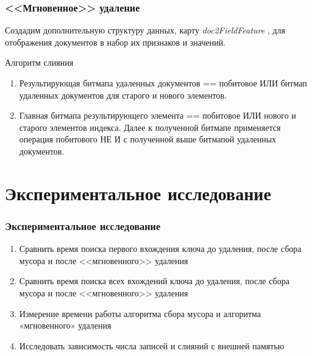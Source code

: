 \documentclass[aspectratio=169, pdf, 8pt, unicode]{beamer}
\begin{document}
\begin{frame}[fragile]
\frametitle{<<Мгновенное>> удаление}

Создадим дополнительную структуру данных, карту \textit{doc2FieldFeature} , для отображения документов в набор их признаков и значений.

\begin{block}{Алгоритм слияния}
    \begin{enumerate}
        \item Результирующая битмапа удаленных документов == побитовое ИЛИ битмап удаленных документов для старого и нового элементов.
        \item Главная битмапа результирующего элемента == побитовое ИЛИ нового и старого элементов индекса. Далее к полученной битмапе
        применяется операция побитового НЕ И с полученной выше битмапой удаленных документов.
    \end{enumerate}
\end{block}
\end{frame}

\section{Экспериментальное исследование}

\begin{frame}[fragile]
\frametitle{Экспериментальное исследование}

\begin{enumerate}
    \item Сравнить время поиска первого вхождения ключа до удаления,
    после сбора мусора и после <<мгновенного>> удаления
    \vspace{4mm}
    \item Сравнить время поиска всех вхождений ключа до удаления,
    после сбора мусора и после <<мгновенного>> удаления
    \vspace{4mm}
    \item Измерение времени работы алгоритма сбора мусора и алгоритма
    «мгновенного» удаления
    \vspace{4mm}
    \item Исследовать зависимость числа записей и слияний с внешней памятью
\end{enumerate}
\end{frame}
\end{document}
